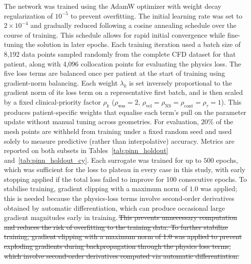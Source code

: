 ﻿\documentclass[12pt,a4paper]{article}
\newcommand{\added}[2][]{\begingroup\color{red}#2\endgroup}
\newcommand{\deleted}[2][]{\begingroup\color{red}\sout{#2}\endgroup}
\newcommand{\replaced}[3][]{\added{#2}\,\deleted{#3}}
\newcommand{\addp}[1]{\added{#1}}
\theoremstyle{definition}
\numberwithin{equation}{section}
\begin{document}
{The network was trained using the AdamW optimizer with weight decay regularization of $10^{-5}$ to prevent overfitting. The initial learning rate was set to {$2 \times 10^{-4}$} and gradually reduced following a cosine annealing schedule over the course of training. This schedule allows for rapid initial convergence while fine-tuning the solution in later epochs. Each training iteration used a batch size of {8,192} data points sampled randomly from the complete CFD dataset for that patient, along with {4,096} collocation points for evaluating the physics loss. \addp{The five loss terms are balanced once per patient at the start of training using gradient-norm balancing. Each weight $\lambda_k$ is set inversely proportional to the gradient norm of its loss term on a representative first batch, and is then scaled by a fixed clinical-priority factor $\rho_k$ ($\rho_{\text{wss}}=2$, $\rho_{\text{vel}}=\rho_{\text{NS}}=\rho_{\text{cont}}=\rho_{\tau}=1$). This produces patient-specific weights that equalise each term's pull on the parameter update without manual tuning across geometries.} \addp{For evaluation, $20\%$ of the mesh points are withheld from training under a fixed random seed and used solely to measure predictive (rather than interpolative) accuracy. Metrics are reported on both subsets in Tables~\ref{tab:pinn_holdout} and~\ref{tab:pinn_holdout_cy}.} Each surrogate was trained for up to $500$ epochs, which was sufficient for the loss to plateau in every case in this study, with early stopping applied if the total loss failed to improve for {100} consecutive epochs. \replaced[id=pinn]{To stabilise training, gradient clipping with a maximum norm of $1.0$ was applied; this is needed because the physics-loss terms involve second-order derivatives obtained by automatic differentiation, which can produce occasional large gradient magnitudes early in training.}{This prevents unnecessary computation and reduces the risk of overfitting to the training data. To further stabilize training, gradient clipping with a maximum norm of 1.0 was applied to prevent exploding gradients during backpropagation through the physics loss terms, which involve second-order derivatives computed via automatic differentiation.}

}
\end{document}

